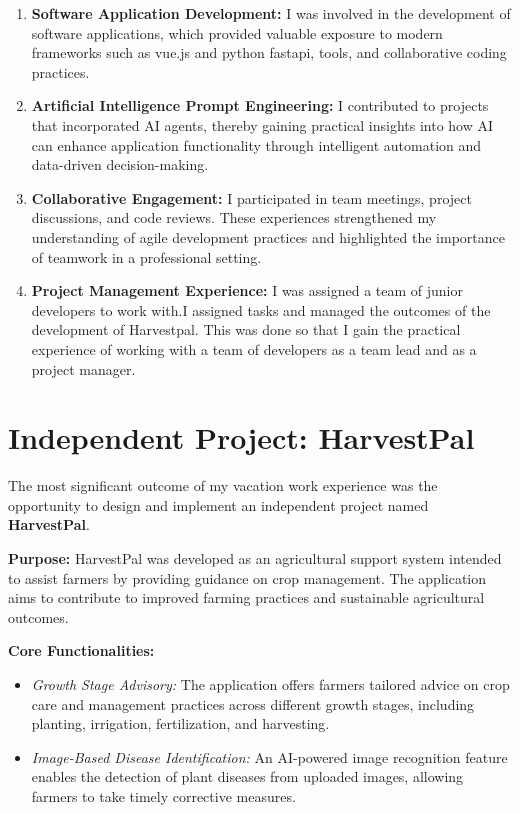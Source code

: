\documentclass[12pt,a4paper]{report}
\begin{document}
	\begin{enumerate}
		\item \textbf{Software Application Development:} I was involved in the development of software applications, which provided valuable exposure to modern frameworks such as vue.js and python fastapi, tools, and collaborative coding practices.
		
		\item \textbf{Artificial Intelligence Prompt Engineering:} I contributed to projects that incorporated AI agents, thereby gaining practical insights into how AI can enhance application functionality through intelligent automation and data-driven decision-making.
		
		\item \textbf{Collaborative Engagement:} I participated in team meetings, project discussions, and code reviews. These experiences strengthened my understanding of agile development practices and highlighted the importance of teamwork in a professional setting.
		
		\item \textbf{Project Management Experience: } I was assigned a team of junior developers to work with.I assigned tasks and managed the outcomes of the development of Harvestpal. This was done so that I gain the practical experience of working with a team of developers as a team lead and as a project manager. 
	\end{enumerate}
	
	\section*{Independent Project: HarvestPal}
	The most significant outcome of my vacation work experience was the opportunity to design and implement an independent project named \textbf{HarvestPal}.
	
	\textbf{Purpose:} HarvestPal was developed as an agricultural support system intended to assist farmers by providing guidance on crop management. The application aims to contribute to improved farming practices and sustainable agricultural outcomes.
	
	\textbf{Core Functionalities:}
	\begin{itemize}
		\item \textit{Growth Stage Advisory:} The application offers farmers tailored advice on crop care and management practices across different growth stages, including planting, irrigation, fertilization, and harvesting.
		\item \textit{Image-Based Disease Identification:} An AI-powered image recognition feature enables the detection of plant diseases from uploaded images, allowing farmers to take timely corrective measures.
	\end{itemize}
	
\end{document}
